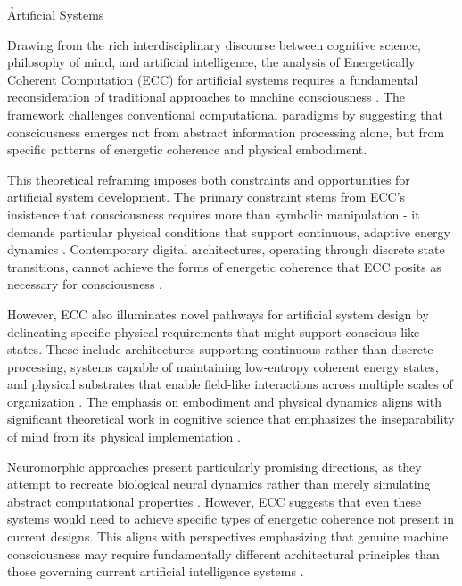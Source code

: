 \h{Artificial Systems}

\begin{refsection}

Drawing from the rich interdisciplinary discourse between cognitive science, philosophy of mind, and artificial intelligence, the analysis of Energetically Coherent Computation (ECC) for artificial systems requires a fundamental reconsideration of traditional approaches to machine consciousness \cite{Dehaene2017}. The framework challenges conventional computational paradigms by suggesting that consciousness emerges not from abstract information processing alone, but from specific patterns of energetic coherence and physical embodiment.

This theoretical reframing imposes both constraints and opportunities for artificial system development. The primary constraint stems from ECC's insistence that consciousness requires more than symbolic manipulation - it demands particular physical conditions that support continuous, adaptive energy dynamics \cite{Brooks1991}. Contemporary digital architectures, operating through discrete state transitions, cannot achieve the forms of energetic coherence that ECC posits as necessary for consciousness \cite{vanGelder1998}.

However, ECC also illuminates novel pathways for artificial system design by delineating specific physical requirements that might support conscious-like states. These include architectures supporting continuous rather than discrete processing, systems capable of maintaining low-entropy coherent energy states, and physical substrates that enable field-like interactions across multiple scales of organization \cite{Froese2009}. The emphasis on embodiment and physical dynamics aligns with significant theoretical work in cognitive science that emphasizes the inseparability of mind from its physical implementation \cite{Thompson2007}.

Neuromorphic approaches present particularly promising directions, as they attempt to recreate biological neural dynamics rather than merely simulating abstract computational properties \cite{Shanahan2010}. However, ECC suggests that even these systems would need to achieve specific types of energetic coherence not present in current designs. This aligns with perspectives emphasizing that genuine machine consciousness may require fundamentally different architectural principles than those governing current artificial intelligence systems \cite{Holland2003}.


\end{refsection}
